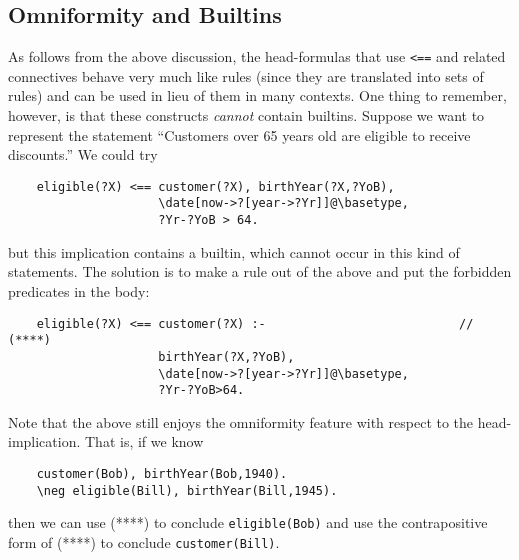 \subsection{Omniformity and Builtins}
As follows from the above discussion, the head-formulas that 
use \texttt{<==} and related connectives behave very much like rules (since
they are translated into sets of rules) and can
be used in lieu of them in many contexts. One thing to remember, however,
is that these constructs \emph{cannot} contain builtins. 
Suppose we want to represent the statement ``Customers over 65 years old
are eligible to receive discounts.'' We could try
\begin{verbatim}
    eligible(?X) <== customer(?X), birthYear(?X,?YoB),
                     \date[now->?[year->?Yr]]@\basetype,
                     ?Yr-?YoB > 64.
\end{verbatim}
but this implication contains a builtin, which
cannot occur in this kind of statements. The solution is to make a rule out
of the above and put the forbidden predicates in the body:
\begin{verbatim}
    eligible(?X) <== customer(?X) :-                           //  (****)
                     birthYear(?X,?YoB),
                     \date[now->?[year->?Yr]]@\basetype,
                     ?Yr-?YoB>64.
\end{verbatim}
Note that the above still enjoys the omniformity feature with respect to
the head-implication. That is, if we know
\begin{verbatim}
    customer(Bob), birthYear(Bob,1940).
    \neg eligible(Bill), birthYear(Bill,1945).
\end{verbatim}
then we can use (****) to
conclude \texttt{eligible(Bob)} and use the
contrapositive form of (****) to conclude
\texttt{\RULELOGNEG customer(Bill)}.



